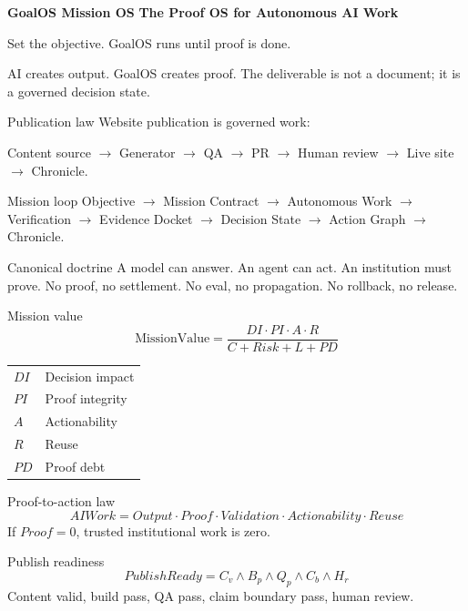 \documentclass[10pt,landscape]{article}
\begin{document}
{\sffamily\bfseries\Large GoalOS Mission OS}\hfill{\sffamily\bfseries\color{Gold} The Proof OS for Autonomous AI Work}\par
{\sffamily Set the objective. GoalOS runs until proof is done.}\vspace{2mm}
\begin{hero}AI creates output. GoalOS creates proof. The deliverable is not a document; it is a governed decision state.\end{hero}
\vspace{2mm}
\begin{minipage}[t]{0.31\linewidth}
\begin{card}{Publication law}
Website publication is governed work:\par
\vspace{1mm}
Content source $\rightarrow$ Generator $\rightarrow$ QA $\rightarrow$ PR $\rightarrow$ Human review $\rightarrow$ Live site $\rightarrow$ Chronicle.
\end{card}
\begin{card}{Mission loop}
Objective $\rightarrow$ Mission Contract $\rightarrow$ Autonomous Work $\rightarrow$ Verification $\rightarrow$ Evidence Docket $\rightarrow$ Decision State $\rightarrow$ Action Graph $\rightarrow$ Chronicle.
\end{card}
\begin{card}{Canonical doctrine}
A model can answer. An agent can act. An institution must prove. No proof, no settlement. No eval, no propagation. No rollback, no release.
\end{card}
\end{minipage}\hfill
\begin{minipage}[t]{0.33\linewidth}
\begin{card}{Mission value}
\[
\mathrm{MissionValue}=\frac{DI\cdot PI\cdot A\cdot R}{C+Risk+L+PD}
\]
\vspace{-2mm}
\begin{tabular}{ll}
$DI$ & Decision impact \\
$PI$ & Proof integrity \\
$A$ & Actionability \\
$R$ & Reuse \\
$PD$ & Proof debt
\end{tabular}
\end{card}
\begin{card}{Proof-to-action law}
\[
AIWork=Output\cdot Proof\cdot Validation\cdot Actionability\cdot Reuse
\]
If $Proof=0$, trusted institutional work is zero.
\end{card}
\begin{card}{Publish readiness}
\[
PublishReady=C_v\land B_p\land Q_p\land C_b\land H_r
\]
Content valid, build pass, QA pass, claim boundary pass, human review.
\end{card}
\end{minipage}\hfill
\end{document}
